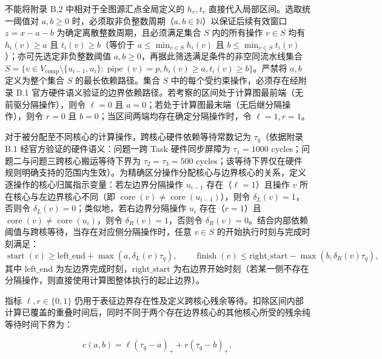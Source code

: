 \documentclass[anonymous,notoc]{gmcm2026}
\begin{document}
不能将附录 B.2 中相对于全图源汇点全局定义的 \(h_v, t_v\) 直接代入局部区间。选取统一阈值对 \(a, b \ge 0\) 时，必须取非负整数周期（\(a, b \in \mathbb{N}\)）以保证后续有效窗口 \(z = x - a - b\) 为确定离散整数周期，且必须满足集合 \(S\) 内的所有操作 \(v \in S\) 均有 \(h_i(v) \ge a\) 且 \(t_i(v) \ge b\)（等价于 \(a \le \min_{v \in S} h_i(v)\) 且 \(b \le \min_{v \in S} t_i(v)\)）；亦可先选定非负整数阈值 \(a, b \ge 0\)，再据此筛选满足条件的非空同流水线集合 \(S = \{v \in V_{\mathrm{comp}} \setminus \{u_{i-1}, u_i\} : \operatorname{pipe}(v) = p, h_i(v) \ge a, t_i(v) \ge b\}\)。严禁将 \(a, b\) 定义为整个集合 \(S\) 的最长依赖路径。集合 \(S\) 中的每个受约束操作，必须存在经附录 B.1 官方硬件语义验证的边界依赖路径。若考察的区间处于计算图最前端（无前驱分隔操作），则令 \(\ell = 0\) 且 \(a = 0\)；若处于计算图最末端（无后继分隔操作），则令 \(r = 0\) 且 \(b = 0\)；当区间两端均存在确定分隔操作时，令 \(\ell = 1, r = 1\)。

对于被分配至不同核心的计算操作，跨核心硬件依赖等待常数记为 \(\tau_q\)（依据附录 B.1 经官方验证的硬件语义：问题一跨 Task 硬件同步屏障为 \(\tau_1 = 1000\) cycles；问题二与问题三跨核心搬运等待下界为 \(\tau_2 = \tau_3 = 500\) cycles；该等待下界仅在硬件规则明确支持的范围内生效）。为精确区分操作分配核心与边界核心的关系，定义逐操作的核心归属指示变量：若左边界分隔操作 \(u_{i-1}\) 存在（\(\ell = 1\)）且操作 \(v\) 所在核心与左边界核心不同（即 \(\operatorname{core}(v) \ne \operatorname{core}(u_{i-1})\)），则令 \(\delta_L(v) = 1\)，否则令 \(\delta_L(v) = 0\)；类似地，若右边界分隔操作 \(u_i\) 存在（\(r = 1\)）且 \(\operatorname{core}(v) \ne \operatorname{core}(u_i)\)，则令 \(\delta_R(v) = 1\)，否则令 \(\delta_R(v) = 0\)。结合内部依赖阈值与跨核等待，当存在对应侧分隔操作时，任意 \(v \in S\) 的开始执行时刻与完成时刻满足： \begin{equation}
\operatorname{start}(v) \ge \text{left\_end} + \max(a, \delta_L(v) \tau_q), \qquad \operatorname{finish}(v) \le \text{right\_start} - \max(b, \delta_R(v) \tau_q),
\end{equation} 其中 \(\text{left\_end}\) 为左边界完成时刻，\(\text{right\_start}\) 为右边界开始时刻（若某一侧不存在分隔操作，则直接使用计算图整体执行的起止边界）。

指标 \(\ell, r \in \{0, 1\}\) 仍用于表征边界存在性及定义跨核心残余等待。扣除区间内部计算已覆盖的重叠时间后，同时不同于两个存在边界核心的其他核心所受的残余纯等待时间下界为：

\begin{equation}
c(a,b) = \ell(\tau_q - a)_+ + r(\tau_q - b)_+,
\end{equation}
\end{document}
